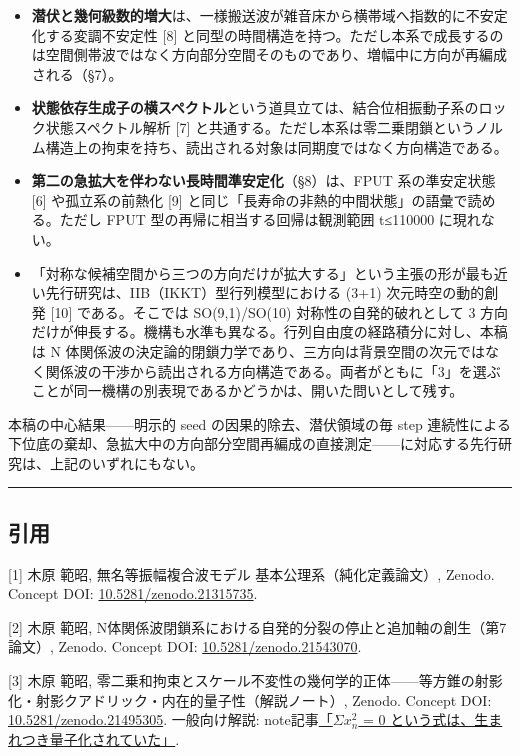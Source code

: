 \documentclass[
  a4paper,
]{ltjsarticle}
\providecommand{\tightlist}{%
  \setlength{\itemsep}{0pt}\setlength{\parskip}{0pt}}
\begin{document}
\begin{itemize}
\tightlist
\item
  \textbf{潜伏と幾何級数的増大}は、一様搬送波が雑音床から横帯域へ指数的に不安定化する変調不安定性
  {[}8{]}
  と同型の時間構造を持つ。ただし本系で成長するのは空間側帯波ではなく方向部分空間そのものであり、増幅中に方向が再編成される（§7）。
\item
  \textbf{状態依存生成子の横スペクトル}という道具立ては、結合位相振動子系のロック状態スペクトル解析
  {[}7{]}
  と共通する。ただし本系は零二乗閉鎖というノルム構造上の拘束を持ち、読出される対象は同期度ではなく方向構造である。
\item
  \textbf{第二の急拡大を伴わない長時間準安定化}（§8）は、FPUT
  系の準安定状態 {[}6{]} や孤立系の前熱化 {[}9{]}
  と同じ「長寿命の非熱的中間状態」の語彙で読める。ただし FPUT
  型の再帰に相当する回帰は観測範囲 t≤110000 に現れない。
\item
  「対称な候補空間から三つの方向だけが拡大する」という主張の形が最も近い先行研究は、IIB（IKKT）型行列模型における
  (3+1) 次元時空の動的創発 {[}10{]} である。そこでは SO(9,1)/SO(10)
  対称性の自発的破れとして 3
  方向だけが伸長する。機構も水準も異なる。行列自由度の経路積分に対し、本稿は
  N
  体関係波の決定論的閉鎖力学であり、三方向は背景空間の次元ではなく関係波の干渉から読出される方向構造である。両者がともに「3」を選ぶことが同一機構の別表現であるかどうかは、開いた問いとして残す。
\end{itemize}

本稿の中心結果------明示的 seed の因果的除去、潜伏領域の毎 step
連続性による下位底の棄却、急拡大中の方向部分空間再編成の直接測定------に対応する先行研究は、上記のいずれにもない。

\begin{center}\rule{0.5\linewidth}{0.5pt}\end{center}

\subsection{引用}\label{ux5f15ux7528}

{[}1{]} 木原 範昭, 無名等振幅複合波モデル 基本公理系（純化定義論文）,
Zenodo. Concept DOI:
\href{https://doi.org/10.5281/zenodo.21315735}{10.5281/zenodo.21315735}.

{[}2{]} 木原 範昭,
N体関係波閉鎖系における自発的分裂の停止と追加軸の創生（第7論文）,
Zenodo. Concept DOI:
\href{https://doi.org/10.5281/zenodo.21543070}{10.5281/zenodo.21543070}.

{[}3{]} 木原 範昭,
零二乗和拘束とスケール不変性の幾何学的正体------等方錐の射影化・射影クアドリック・内在的量子性（解説ノート）,
Zenodo. Concept DOI:
\href{https://doi.org/10.5281/zenodo.21495305}{10.5281/zenodo.21495305}.
一般向け解説:
note記事\href{https://note.com/kiharanoriaki/n/nc0ea47060f4b}{「\(\Sigma x_n^2\)
= 0 という式は、生まれつき量子化されていた」}.
\end{document}
